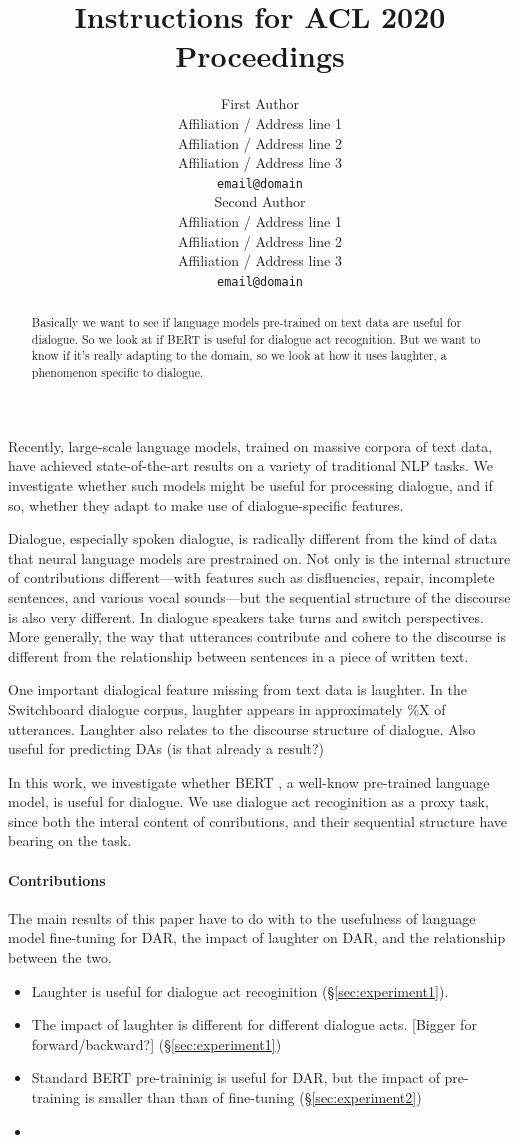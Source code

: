 \documentclass[11pt,a4paper]{article}
\title{Instructions for ACL 2020 Proceedings}
\author{First Author \\
  Affiliation / Address line 1 \\
  Affiliation / Address line 2 \\
  Affiliation / Address line 3 \\
  \texttt{email@domain} \\\And
  Second Author \\
  Affiliation / Address line 1 \\
  Affiliation / Address line 2 \\
  Affiliation / Address line 3 \\
  \texttt{email@domain} \\}
\date{}
\begin{document}
\maketitle
\begin{abstract}
  Basically we want to see if language models pre-trained on text data are useful for dialogue.
  So we look at if BERT is useful for dialogue act recognition.
  But we want to know if it's really adapting to the domain, so we look at how it uses laughter, a phenomenon specific to dialogue.
\end{abstract}


Recently, large-scale language models, trained on massive corpora of text data, have achieved state-of-the-art results on a variety of traditional NLP tasks.
We investigate whether such models might be useful for processing dialogue, and if so, whether they adapt to make use of dialogue-specific features.

Dialogue, especially spoken dialogue, is radically different from the kind of data that neural language models are prestrained on.
Not only is the internal structure of contributions different---with features such as disfluencies, repair, incomplete sentences, and various vocal sounds---but the sequential structure of the discourse is also very different.
In dialogue speakers take turns and switch perspectives.
More generally, the way that utterances contribute and cohere to the discourse is different from the relationship between sentences in a piece of written text.

One important dialogical feature missing from text data is laughter.
In the Switchboard dialogue corpus, laughter appears in approximately \%X of utterances.
Laughter also relates to the discourse structure of dialogue. 
Also useful for predicting DAs (is that already a result?)

In this work, we investigate whether BERT \citep{devlinBERTPretrainingDeep2018}, a well-know pre-trained language model, is useful for dialogue.
We use dialogue act recoginition as a proxy task, since both the interal content of conributions, and their sequential structure have bearing on the task.

\paragraph{Contributions}
The main results of this paper have to do with to the usefulness of language model fine-tuning for DAR, 
the impact of laughter on DAR, and the relationship between the two.
\begin{itemize}
  \item Laughter is useful for dialogue act recoginition (\S\ref{sec:experiment1}).
  \item The impact of laughter is different for different dialogue acts. [Bigger for forward/backward?] (\S\ref{sec:experiment1})
  \item Standard BERT pre-traininig is useful for DAR, but the impact of pre-training is smaller than than of fine-tuning (\S\ref{sec:experiment2})
  \item 
\end{itemize}
\end{document}
